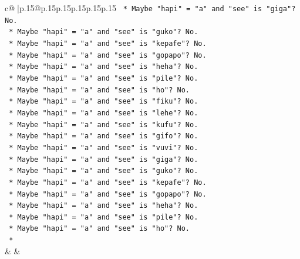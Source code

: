 \documentclass{article}
\begin{document}
{\begin{supertabular}{c@{$\;$}|p{.15\linewidth}@{}p{.15\linewidth}p{.15\linewidth}p{.15\linewidth}p{.15\linewidth}p{.15\linewidth}}
{{{\texttt{                        *   Maybe "hapi" = "a" and "see" is "giga"? No.} \\
\texttt{                        *   Maybe "hapi" = "a" and "see" is "guko"? No.} \\
\texttt{                        *   Maybe "hapi" = "a" and "see" is "kepafe"? No.} \\
\texttt{                        *   Maybe "hapi" = "a" and "see" is "gopapo"? No.} \\
\texttt{                        *   Maybe "hapi" = "a" and "see" is "heha"? No.} \\
\texttt{                        *   Maybe "hapi" = "a" and "see" is "pile"? No.} \\
\texttt{                        *   Maybe "hapi" = "a" and "see" is "ho"? No.} \\
\texttt{                        *   Maybe "hapi" = "a" and "see" is "fiku"? No.} \\
\texttt{                        *   Maybe "hapi" = "a" and "see" is "lehe"? No.} \\
\texttt{                        *   Maybe "hapi" = "a" and "see" is "kufu"? No.} \\
\texttt{                        *   Maybe "hapi" = "a" and "see" is "gifo"? No.} \\
\texttt{                        *   Maybe "hapi" = "a" and "see" is "vuvi"? No.} \\
\texttt{                        *   Maybe "hapi" = "a" and "see" is "giga"? No.} \\
\texttt{                        *   Maybe "hapi" = "a" and "see" is "guko"? No.} \\
\texttt{                        *   Maybe "hapi" = "a" and "see" is "kepafe"? No.} \\
\texttt{                        *   Maybe "hapi" = "a" and "see" is "gopapo"? No.} \\
\texttt{                        *   Maybe "hapi" = "a" and "see" is "heha"? No.} \\
\texttt{                        *   Maybe "hapi" = "a" and "see" is "pile"? No.} \\
\texttt{                        *   Maybe "hapi" = "a" and "see" is "ho"? No.} \\
\texttt{                        *} \\
            }
        }
    }
    & & \\ \\


\end{supertabular}}
\end{document}
